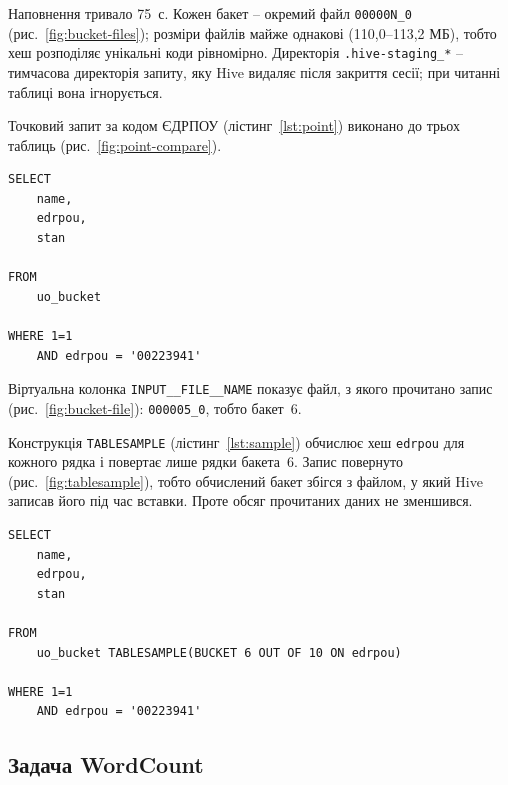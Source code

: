 \documentclass{iasa-lab}
\begin{document}
Наповнення тривало 75~с. Кожен бакет -- окремий файл \texttt{00000N\_0} (рис.~\ref{fig:bucket-files}); розміри файлів майже однакові (110,0--113,2 МБ), тобто хеш розподіляє унікальні коди рівномірно. Директорія \texttt{.hive-staging\_*} -- тимчасова директорія запиту, яку Hive видаляє після закриття сесії; при читанні таблиці вона ігнорується.


Точковий запит за кодом ЄДРПОУ (лістинг~\ref{lst:point}) виконано до трьох таблиць (рис.~\ref{fig:point-compare}).

\begin{lstlisting}[language=HiveQL, caption={Точковий запит за кодом ЄДРПОУ}, label={lst:point}]
SELECT
    name,
    edrpou,
    stan

FROM
    uo_bucket

WHERE 1=1
    AND edrpou = '00223941'
\end{lstlisting}


Віртуальна колонка \texttt{INPUT\_\_FILE\_\_NAME} показує файл, з якого прочитано запис (рис.~\ref{fig:bucket-file}): \texttt{000005\_0}, тобто бакет~6.


Конструкція \texttt{TABLESAMPLE} (лістинг~\ref{lst:sample}) обчислює хеш \texttt{edrpou} для кожного рядка і повертає лише рядки бакета~6. Запис повернуто (рис.~\ref{fig:tablesample}), тобто обчислений бакет збігся з файлом, у який Hive записав його під час вставки. Проте обсяг прочитаних даних не зменшився.

\begin{lstlisting}[language=HiveQL, caption={Вибірка одного бакета}, label={lst:sample}]
SELECT
    name,
    edrpou,
    stan

FROM
    uo_bucket TABLESAMPLE(BUCKET 6 OUT OF 10 ON edrpou)

WHERE 1=1
    AND edrpou = '00223941'
\end{lstlisting}


\subsection{Задача WordCount}
\end{document}
